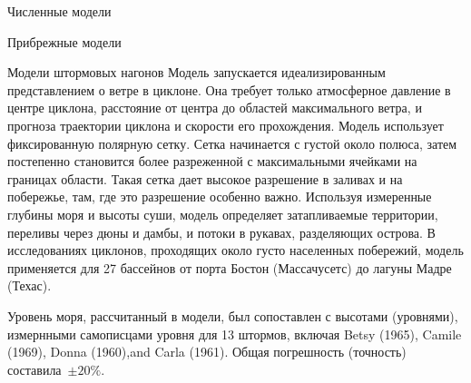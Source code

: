 \begin{chapter}{Численные модели}
\begin{section}{Прибрежные модели}
\begin{paragraph}{Модели штормовых нагонов}
Модель запускается идеализированным представлением о ветре в
циклоне. Она требует только атмосферное давление в центре циклона,
расстояние от центра до областей максимального ветра, и прогноза
траектории циклона и скорости его прохождения.  Модель использует
фиксированную полярную сетку. Сетка начинается с густой около полюса,
затем постепенно становится более разреженной с максимальными ячейками
на границах области. Такая сетка дает высокое разрешение в заливах и
на побережье, там, где это разрешение особенно важно. Используя
измеренные глубины моря и высоты суши, модель определяет затапливаемые
территории, переливы через дюны и дамбы, и потоки в рукавах,
разделяющих острова. В исследованиях циклонов, проходящих около густо
населенных побережий, модель применяется для 27 бассейнов от порта
Бостон (Массачусетс) до лагуны Мадре (Техас).
%
%

Уровень моря, рассчитанный в модели, был сопоставлен с высотами
(уровнями), измернными самописцами уровня для 13 штормов, включая
Betsy (1965), Camile (1969), Donna (1960),and Carla (1961). Общая
погрешность (точность) составила~$\pm20\%$.
%


\end{paragraph}
\end{section}
\end{chapter}
